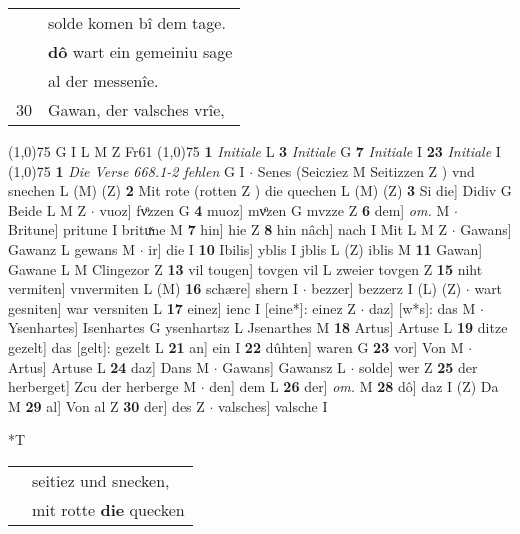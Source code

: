 \documentclass[8pt,a4paper,notitlepage]{article}
\begin{document}
\begin{table}[ht]
\begin{minipage}[t]{0.5\linewidth}
\begin{tabular}{rl}
 & solde komen bî dem tage.\\ 
 & \textbf{dô} wart ein gemeiniu sage\\ 
 & al der messenîe.\\ 
30 & Gawan, der valsches vrîe,\\ 
\end{tabular}
\scriptsize
\line(1,0){75} \newline
G I L M Z Fr61 \newline
\line(1,0){75} \newline
\textbf{1} \textit{Initiale} L  \textbf{3} \textit{Initiale} G  \textbf{7} \textit{Initiale} I  \textbf{23} \textit{Initiale} I  \newline
\line(1,0){75} \newline
\textbf{1} \textit{Die Verse 668.1-2 fehlen} G I   $\cdot$ Senes (Seicziez M Seitizzen Z ) vnd snechen L (M) (Z) \textbf{2} Mit rote (rotten Z ) die quechen L (M) (Z) \textbf{3} Si die] Didiv G Beide L M Z  $\cdot$ vuoz] fvͦzzen G \textbf{4} muoz] mvͦzen G mvzze Z \textbf{6} dem] \textit{om.} M  $\cdot$ Britune] pritune I brituͯne M \textbf{7} hin] hie Z \textbf{8} hin nâch] nach I Mit L M Z  $\cdot$ Gawans] Gawanz L gewans M  $\cdot$ ir] die I \textbf{10} Ibilis] yblis I jblis L (Z) iblis M \textbf{11} Gawan] Gawane L M Clingezor Z \textbf{13} vil tougen] tovgen vil L zweier tovgen Z \textbf{15} niht vermiten] vnvermiten L (M) \textbf{16} schære] shern I  $\cdot$ bezzer] bezzerz I (L) (Z)  $\cdot$ wart gesniten] war versniten L \textbf{17} einez] ienc I [eine*]: einez Z  $\cdot$ daz] [w*s]: das M  $\cdot$ Ysenhartes] Isenhartes G ysenhartsz L Jsenarthes M \textbf{18} Artus] Artuse L \textbf{19} ditze gezelt] das [gelt]: gezelt L \textbf{21} an] ein I \textbf{22} dûhten] waren G \textbf{23} vor] Von M  $\cdot$ Artus] Artuse L \textbf{24} daz] Dans M  $\cdot$ Gawans] Gawansz L  $\cdot$ solde] wer Z \textbf{25} der herberget] Zcu der herberge M  $\cdot$ den] dem L \textbf{26} der] \textit{om.} M \textbf{28} dô] daz I (Z) Da M \textbf{29} al] Von al Z \textbf{30} der] des Z  $\cdot$ valsches] valsche I \newline
\end{minipage}
\hspace{0.5cm}
\begin{minipage}[t]{0.5\linewidth}
\small
\begin{center}*T
\end{center}
\begin{tabular}{rl}
 & seitiez und snecken,\\ 
 & mit rotte \textbf{die} quecken\\ 

\end{tabular}
\end{minipage}
\end{table}
\end{document}
